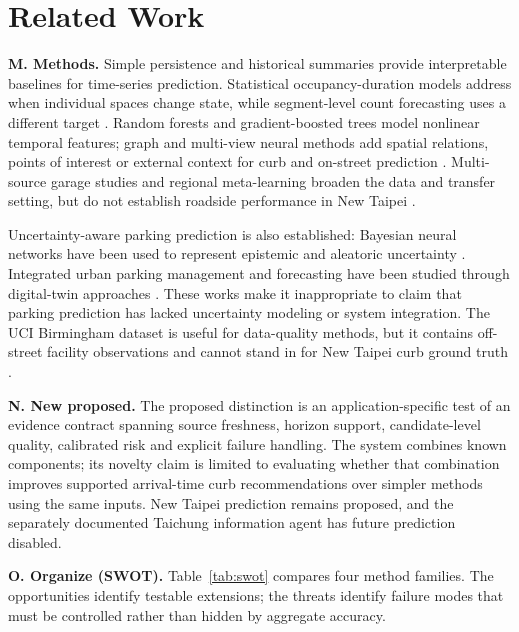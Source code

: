 \documentclass[conference,letterpaper,10pt]{IEEEtran}
\begin{document}
\section{Related Work}
\noindent\textbf{M. Methods.} Simple persistence and historical summaries provide interpretable baselines for time-series prediction. Statistical occupancy-duration models address when individual spaces change state, while segment-level count forecasting uses a different target \cite{schneble2025}. Random forests and gradient-boosted trees model nonlinear temporal features; graph and multi-view neural methods add spatial relations, points of interest or external context for curb and on-street prediction \cite{cao2025,qian2025}. Multi-source garage studies and regional meta-learning broaden the data and transfer setting, but do not establish roadside performance in New Taipei \cite{vakrinou2026,kuang2025}.

Uncertainty-aware parking prediction is also established: Bayesian neural networks have been used to represent epistemic and aleatoric uncertainty \cite{nezhadettehad2025}. Integrated urban parking management and forecasting have been studied through digital-twin approaches \cite{piccialli2025}. These works make it inappropriate to claim that parking prediction has lacked uncertainty modeling or system integration. The UCI Birmingham dataset is useful for data-quality methods, but it contains off-street facility observations and cannot stand in for New Taipei curb ground truth \cite{stolfi2017}.

\noindent\textbf{N. New proposed.} The proposed distinction is an application-specific test of an evidence contract spanning source freshness, horizon support, candidate-level quality, calibrated risk and explicit failure handling. The system combines known components; its novelty claim is limited to evaluating whether that combination improves supported arrival-time curb recommendations over simpler methods using the same inputs. New Taipei prediction remains proposed, and the separately documented Taichung information agent has future prediction disabled.

\noindent\textbf{O. Organize (SWOT).} Table~\ref{tab:swot} compares four method families. The opportunities identify testable extensions; the threats identify failure modes that must be controlled rather than hidden by aggregate accuracy.
\end{document}
